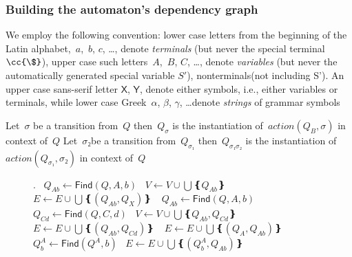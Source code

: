 \subsubsection*{Building the automaton's dependency graph}

  We employ the following convention:
  lower case letters from the beginning of the Latin alphabet,~$a$,~$b$, $c$, …,
  denote \emph{terminals} (but never the special terminal~$\cc{\$}$),
    upper case such letters~$A$,~$B$, $C$, …, denote \emph{variables}
  (but never the automatically generated special variable $S'$), 
  nonterminals(not including S').
  An upper case sans-serif letter $\mathsf X$, $\mathsf Y$, denote
    either symbols, i.e., either variables or terminals,
    while lower case Greek~$α$, $β$, $γ$, \ldots denote \emph{strings} of grammar symbols

    Let~$σ$ be a transition from~$Q$ then~$Q_{σ}$
    is the instantiation of~$action(Q_{B},σ)$ in context
    of~$Q$
    Let~$σ₂$be a transition from~$Q_{σ₁}$ then~$Q_{σ₁σ₂}$
    is the instantiation of~$action(Q_{σ₁},σ₂)$
    in context of~$Q$
\begin{figure}
  \begin{algorithmic}[1]
    .
     
    \ENDFOR
    \STATE~$Q_{Ab}←\textsf{Find}(Q,A,b)$
    \STATE~$V←V\cup \bigcup❴ Q_{Ab}❵~$
    \STATE~$E←E\cup \bigcup❴ (Q_{Ab},Q_{X})❵~$
    \ENDFOR
    \STATE~$Q_{Ab}←\textsf{Find}(Q,A,b)$
    \STATE~$Q_{Cd}←\textsf{Find}(Q,C,d)$
    \STATE~$V←V\cup \bigcup❴ Q_{Ab},Q_{Cd}❵~$
    \STATE~$E←E\cup \bigcup❴ (Q_{Ab},Q_{Cd})❵~$
    \ENDIF
    \ENDFOR
    \STATE~$E←E\cup \bigcup❴ (Q_{A},Q_{Ab})❵~$
    \STATE~$Q_{b}^{A}←\textsf{Find}(Q^{A},b)$
    \STATE~$E←E\cup \bigcup❴ (Q_{b}^{A},Q_{Ab})❵~$
    \ENDFOR
    \ENDFOR
  \end{algorithmic}
\end{figure}




